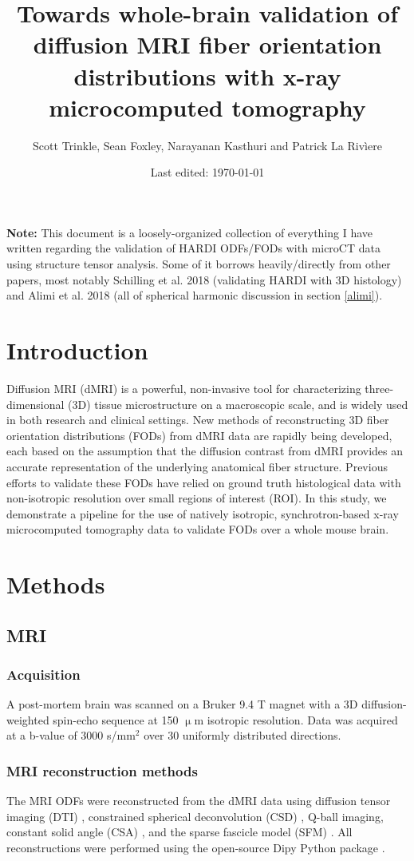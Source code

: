\documentclass[11pt]{article}
\title{Towards whole-brain validation of diffusion MRI fiber orientation
  distributions with x-ray microcomputed tomography}
\author{Scott Trinkle, Sean
  Foxley, Narayanan Kasthuri and Patrick La Riv\`iere}
\date{Last edited: \today}
\begin{document}
\maketitle

\textbf{Note:} This document is a loosely-organized collection of everything I
have written regarding the validation of HARDI ODFs/FODs with microCT data using
structure tensor analysis. Some of it borrows heavily/directly from other
papers, most notably Schilling et al. 2018 \cite{Schilling2018} (validating
HARDI with 3D histology) and Alimi et al. 2018 \cite{Alimi2018} (all of
spherical harmonic discussion in section \ref{alimi}).


\section{Introduction}
Diffusion MRI (dMRI) is a powerful, non-invasive tool for characterizing
three-dimensional (3D) tissue microstructure on a macroscopic scale, and is
widely used in both research and clinical settings. New methods of
reconstructing 3D fiber orientation distributions (FODs) from dMRI data are
rapidly being developed, each based on the assumption that the diffusion
contrast from dMRI provides an accurate representation of the underlying
anatomical fiber structure. Previous efforts to validate these FODs have relied
on ground truth histological data with non-isotropic resolution over small
regions of interest (ROI). In this study, we demonstrate a pipeline for the use
of natively isotropic, synchrotron-based x-ray microcomputed tomography data to
validate FODs over a whole mouse brain.

\section{Methods}
\subsection{MRI}
\subsubsection{Acquisition}
A post-mortem brain was scanned on a Bruker 9.4 T magnet with a 3D
diffusion-weighted spin-echo sequence at 150 $\upmu$m isotropic
resolution. Data was acquired at a b-value of 3000 s/mm$^2$ over 30 uniformly
distributed directions.

\subsubsection{MRI reconstruction methods}
The MRI ODFs were reconstructed from the dMRI data using diffusion tensor
imaging (DTI) \cite{Basser1994}, constrained spherical deconvolution (CSD)
\cite{Tournier2004}, Q-ball imaging, constant solid angle (CSA)
\cite{Aganj2010}, and the sparse fascicle model (SFM) \cite{Rokem2015}. All
reconstructions were performed using the open-source Dipy Python package
\cite{Garyfallidis2014}.
\end{document}
